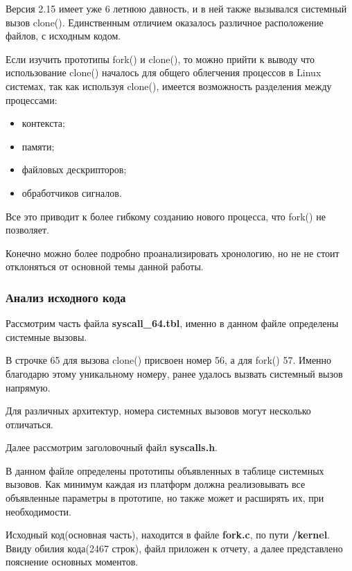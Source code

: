 Версия 2.15 имеет уже 6 летнюю давность, и в ней также вызывался системный вызов clone(). Единственным отличием оказалось различное расположение файлов, с исходным кодом. 

Если изучить прототипы fork() и clone(), то можно прийти к выводу что использование clone() началось для общего облегчения процессов в Linux системах, так как используя clone(), имеется возможность разделения между процессами:
\begin{itemize}
\item контекста;
\item памяти;
\item файловых дескрипторов;
\item обработчиков сигналов.
\end{itemize}
Все это приводит к более гибкому созданию нового процесса, что fork() не позволяет.


Конечно можно более подробно проанализировать хронологию, но не не стоит отклоняться от основной темы данной работы.
\subsubsection{Анализ исходного кода}
Рассмотрим часть файла \textbf{syscall\_64.tbl}, именно в данном файле определены системные вызовы.

В строчке 65 для вызова clone() присвоен номер 56, а для fork() 57. Именно благодарю этому уникальному номеру, ранее удалось вызвать системный вызов напрямую.

Для различных архитектур, номера системных вызовов могут несколько отличаться.

Далее рассмотрим заголовочный файл \textbf{syscalls.h}.

В данном файле определены прототипы объявленных в таблице системных вызовов. Как минимум каждая из платформ должна реализовывать все объявленные параметры в прототипе, но также может и расширять их, при необходимости.

Исходный код(основная часть), находится в файле \textbf{fork.c}, по пути \textbf{/kernel}. Ввиду обилия кода(2467 строк), файл приложен к отчету, а далее представлено пояснение основных моментов.

